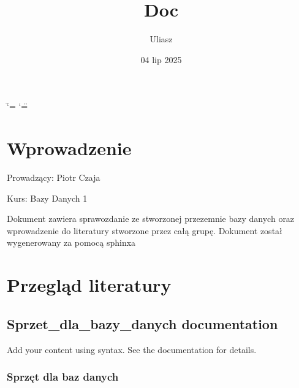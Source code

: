 \documentclass[letterpaper,10pt,polish]{sphinxmanual}
\title{Doc}
\date{04 lip 2025}
\author{Uliasz}
\begin{document}
\ifdefined\shorthandoff
  \ifnum\catcode`\=\string=\active\shorthandoff{=}\fi
  \ifnum\catcode`\"=\active{}\fi
\fi

\pagestyle{empty}
\sphinxmaketitle
\pagestyle{plain}
\sphinxtableofcontents
\pagestyle{normal}
\label{\detokenize{index::doc}}


\sphinxstepscope


\chapter{Wprowadzenie}
\label{\detokenize{rozdzial1/index:wprowadzenie}}\label{\detokenize{rozdzial1/index::doc}}
\sphinxAtStartPar
Prowadzący: Piotr Czaja

\sphinxAtStartPar
Kurs: Bazy Danych 1

\sphinxAtStartPar
Dokument zawiera sprawozdanie ze stworzonej przezemnie bazy danych oraz wprowadzenie do literatury stworzone przez całą grupę. Dokument został wygenerowany za pomocą sphinxa

\sphinxstepscope


\chapter{Przegląd literatury}
\label{\detokenize{rozdzial2/index:przeglad-literatury}}\label{\detokenize{rozdzial2/index::doc}}
\sphinxstepscope


\section{Sprzet\_dla\_bazy\_danych documentation}
\label{\detokenize{rozdzial2/Sprzet-dla-bazy-danych/source/index:sprzet-dla-bazy-danych-documentation}}\label{\detokenize{rozdzial2/Sprzet-dla-bazy-danych/source/index::doc}}
\sphinxAtStartPar
Add your content using  syntax. See the
documentation for details.

\sphinxstepscope


\subsection{Sprzęt dla baz danych}
\label{\detokenize{rozdzial2/Sprzet-dla-bazy-danych/source/SprzetDlaBazyDanych:sprzet-dla-baz-danych}}\label{\detokenize{rozdzial2/Sprzet-dla-bazy-danych/source/SprzetDlaBazyDanych::doc}}
\end{document}
